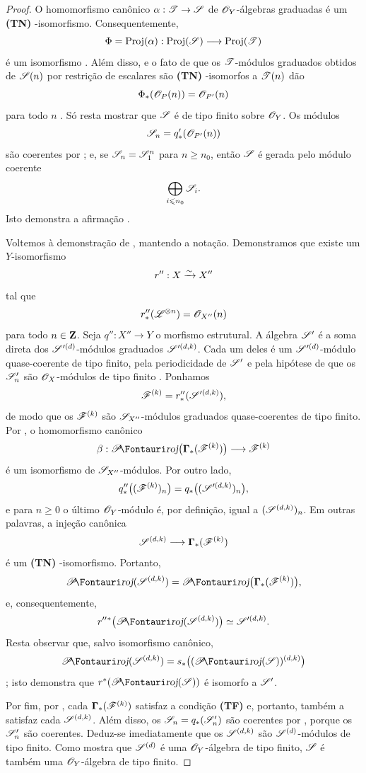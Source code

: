 \begin{proof}
O homomorfismo canônico $\alpha:\sh{T}\to\sh{S}$ de $\mathscr{O}_Y$-álgebras graduadas é um \textbf{(TN) }-isomorfismo.
Consequentemente,
\label{III.2.3.5.1}
\[
  \Phi=\operatorname{Proj}(\alpha):\operatorname{Proj}(\mathscr{S})\longrightarrow\operatorname{Proj}(\mathscr{T})
\]
é um isomorfismo .
Além disso,  e o fato de que os $\mathscr{T}$-módulos graduados obtidos de $\mathscr{S}(n)$ por restrição de escalares são \textbf{(TN) }-isomorfos a $\mathscr{T}(n)$ dão
\[
  \Phi_*(\mathscr{O}_P(n))=\mathscr{O}_{P'}(n)
\]
para todo $n$ .
Só resta mostrar que $\mathscr{S}$ é de tipo finito sobre $\mathscr{O}_Y$.
Os módulos
\[
  \mathscr{S}_n=q'_*(\mathscr{O}_{P'}(n))
\]
são coerentes por ; e, se $\mathscr{S}_n=\mathscr{S}_1^n$ para $n\geq n_0$, então $\mathscr{S}$ é gerada pelo módulo coerente
\[
  \bigoplus_{i\leqslant n_0}\mathscr{S}_i.
\]
Isto demonstra a afirmação .

Voltemos à demonstração de , mantendo a notação.
Demonstramos que existe um $Y$-isomorfismo
\[
  r'':X\xrightarrow{\sim} X''
\]
tal que
\[
  r''_*(\mathscr{L}^{\otimes n})=\mathscr{O}_{X''}(n)
\]
para todo $n\in\mathbf{Z}$.
Seja $q'':X''\to Y$ o morfismo estrutural.
A álgebra $\mathscr{S}'$ é a soma direta dos $\mathscr{S}'^{(d)}$-módulos graduados $\mathscr{S}'^{(d,k)}$.
Cada um deles é um $\mathscr{S}'^{(d)}$-módulo quase-coerente de tipo finito, pela periodicidade de $\mathscr{S}'$ e pela hipótese de que os $\mathscr{S}'_n$ são $\mathscr{O}_X$-módulos de tipo finito .
Ponhamos
\[
  \mathscr{F}^{(k)}=r''_*(\mathscr{S}'^{(d,k)}),
\]
de modo que os $\mathscr{F}^{(k)}$ são $\mathscr{S}_{X''}$-módulos graduados quase-coerentes de tipo finito.
Por , o homomorfismo canônico
\[
  \beta:\shProj\bigl(\bbGamma_*(\sh{F}^{(k)})\bigr)
  \longrightarrow\sh{F}^{(k)}
\]
é um isomorfismo de $\mathscr{S}_{X''}$-módulos.
Por outro lado,
\[
  q''_*\bigl((\mathscr{F}^{(k)})_n\bigr)
  =q_*\bigl((\mathscr{S}'^{(d,k)})_n\bigr),
\]
e para $n\geq0$ o último $\mathscr{O}_Y$-módulo é, por definição, igual a $(\mathscr{S}^{(d,k)})_n$.
Em outras palavras, a injeção canônica
\[
  \mathscr{S}^{(d,k)}
  \longrightarrow\boldsymbol\Gamma_*(\mathscr{F}^{(k)})
\]
é um \textbf{(TN) }-isomorfismo.
Portanto,
\[
  \shProj(\sh{S}^{(d,k)})
  =\shProj\bigl(\bbGamma_*(\sh{F}^{(k)})\bigr),
\]
e, consequentemente,
\[
  r''{}^*\bigl(\shProj(\sh{S}^{(d,k)})\bigr)
  \simeq\sh{S}'^{(d,k)}.
\]
Resta observar que, salvo isomorfismo canônico,
\[
  \shProj(\sh{S}^{(d,k)})
  =s_*\bigl((\shProj(\sh{S}))^{(d,k)}\bigr)
\]
; isto demonstra que $r^*(\shProj(\sh{S}))$ é isomorfo a $\mathscr{S}'$.

Por fim, por , cada $\boldsymbol\Gamma_*(\mathscr{F}^{(k)})$ satisfaz a condição \textbf{(TF) } e, portanto, também a satisfaz cada $\mathscr{S}^{(d,k)}$.
Além disso, os $\mathscr{S}_n=q_*(\mathscr{S}'_n)$ são coerentes por , porque os $\mathscr{S}'_n$ são coerentes.
Deduz-se imediatamente que os $\mathscr{S}^{(d,k)}$ são $\mathscr{S}^{(d)}$-módulos de tipo finito.
Como  mostra que $\mathscr{S}^{(d)}$ é uma $\mathscr{O}_Y$-álgebra de tipo finito, $\mathscr{S}$ é também uma $\mathscr{O}_Y$-álgebra de tipo finito.
\end{proof}

